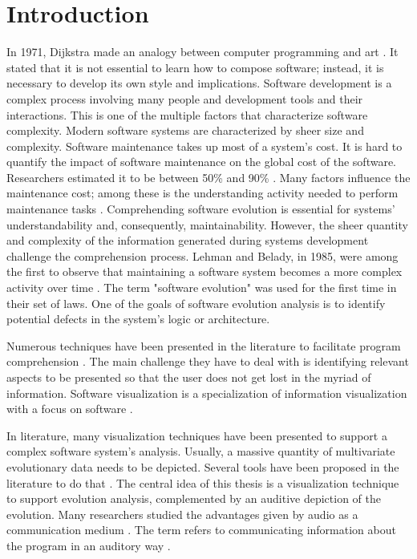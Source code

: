 
\chapter{Introduction}

In 1971, Dijkstra made an analogy between computer programming and art \cite{Dijkstra1971a}.
It stated that it is not essential to learn how to compose software; instead, it is necessary to develop its own style and implications. 
Software development is a complex process involving many people and development tools and their interactions. This is one of the multiple factors that characterize software complexity. 
Modern software systems are characterized by sheer size and complexity. Software maintenance takes up most of a system's cost. It is hard to quantify the impact of software maintenance on the global cost of the software. 
Researchers estimated it to be between 50\% and 90\% \cite{Davis1995, Sommerville1995, Erlikh2000, seacord2003}. Many factors influence the maintenance cost; among these is the understanding activity needed to perform maintenance tasks \cite{Corbi1989}. Comprehending software evolution is essential for systems' understandability and, consequently, maintainability. However, the sheer quantity and complexity of the information generated during systems development challenge the comprehension process. Lehman and Belady, in 1985, were among the first to observe that maintaining a software system becomes a more complex activity over time \cite{Lehman1985}. The term "software evolution" was used for the first time in their set of laws.  One of the goals of software evolution analysis is to identify potential defects in the system's logic or architecture. 

Numerous techniques have been presented in the literature to facilitate program comprehension \cite{Lanza2001, DAmbros2006, Steinbrueckner2010, Wettel2011, Alexandru2019, SoftwareEvolution}. The main challenge they have to deal with is identifying relevant aspects to be presented so that the user does not get lost in the myriad of information. 
Software visualization is a specialization of information visualization with a focus on software \cite{Lanza2003}. 

In literature, many visualization techniques have been presented to support a complex software system's analysis. Usually, a massive quantity of multivariate evolutionary data needs to be depicted. Several tools have been proposed in the literature to do that \cite{Merino2018a}.
The central idea of this thesis is a visualization technique to support evolution analysis, complemented by an auditive depiction of the evolution. 
Many researchers studied the advantages given by audio as a communication medium \cite{Alty1995, Vickers2004, Boccuzzo2009, McIntosh2014, Mancino2017}.
The term  refers to communicating information about the program in an auditory way \cite{DiGiano1992}.

